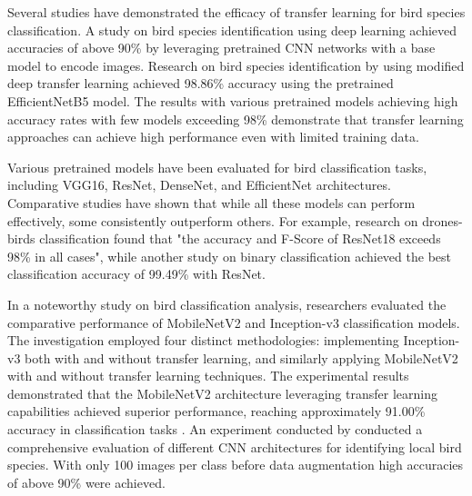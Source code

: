 \documentclass[a4paper,12pt]{report}
\begin{document}
Several studies have demonstrated the efficacy of transfer learning for bird species classification. A study on bird species identification using deep learning achieved accuracies of above 90\% by leveraging pretrained CNN networks with a base model to encode images\citep{Vo2023BirdDA}. Research on bird species identification by \citep{Mochurad2024ANE} using modified deep transfer learning achieved 98.86\% accuracy using the pretrained EfficientNetB5 model. The results with various pretrained models achieving high accuracy rates with few models exceeding 98\% demonstrate that transfer learning approaches can achieve high performance even with limited training data.

Various pretrained models have been evaluated for bird classification tasks, including VGG16, ResNet, DenseNet, and EfficientNet architectures. Comparative studies have shown that while all these models can perform effectively, some consistently outperform others. For example, research on drones-birds classification found that "the accuracy and F-Score of ResNet18 exceeds 98\% in all cases"\citep{Mohamed2023EfficientDC}, while another study on binary classification achieved the best classification accuracy of 99.49\% with ResNet\citep{Ren2023MonkeypoxDD}.

In a noteworthy study on bird classification analysis, researchers evaluated the comparative performance of MobileNetV2 and Inception-v3 classification models. The investigation employed four distinct methodologies: implementing Inception-v3 both with and without transfer learning, and similarly applying MobileNetV2 with and without transfer learning techniques. The experimental results demonstrated that the MobileNetV2 architecture leveraging transfer learning capabilities achieved superior performance, reaching approximately 91.00\% accuracy in classification tasks \citep{Rahman2020}. An experiment conducted by \citep{9402686} conducted a comprehensive evaluation of different CNN architectures for identifying local bird species. With only 100 images per class before data augmentation high accuracies of above 90\% were achieved.

\end{document}
